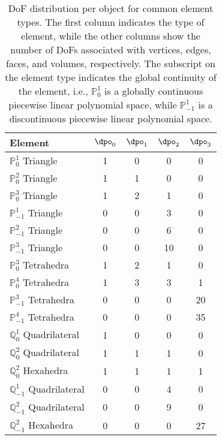 \begin{table}[!h]
\centering
\begin{tabular}{|l|c|c|c|c|}
\hline
\textbf{Element} & $\dpo_0$ & $\dpo_1$ & $\dpo_2$ & $\dpo_3$ \\
\hline
$\mathbb{P}^1_0$ Triangle & 1 & 0 & 0 & 0 \\
$\mathbb{P}^2_0$ Triangle & 1 & 1 & 0 & 0 \\
$\mathbb{P}^3_0$ Triangle & 1 & 2 & 1 & 0 \\
$\mathbb{P}^1_{-1}$ Triangle & 0 & 0 & 3 & 0 \\
$\mathbb{P}^2_{-1}$ Triangle & 0 & 0 & 6 & 0 \\
$\mathbb{P}^3_{-1}$ Triangle & 0 & 0 & 10 & 0 \\
$\mathbb{P}^3_0$ Tetrahedra & 1 & 2 & 1 & 0 \\
$\mathbb{P}^4_0$ Tetrahedra & 1 & 3 & 3 & 1 \\
$\mathbb{P}^3_{-1}$ Tetrahedra & 0 & 0 & 0 & 20 \\
$\mathbb{P}^4_{-1}$ Tetrahedra & 0 & 0 & 0 & 35 \\
\hline
$\mathbb{Q}^1_0$ Quadrilateral & 1 & 0 & 0 & 0 \\
$\mathbb{Q}^2_0$ Quadrilateral & 1 & 1 & 1 & 0 \\
$\mathbb{Q}^2_0$ Hexahedra & 1 & 1 & 1 & 1 \\
$\mathbb{Q}^1_{-1}$ Quadrilateral & 0 & 0 & 4 & 0 \\
$\mathbb{Q}^2_{-1}$ Quadrilateral & 0 & 0 & 9 & 0 \\
$\mathbb{Q}^2_{-1}$ Hexahedra & 0 & 0 & 0 & 27 \\
\hline
\end{tabular}
\caption{DoF distribution per object for common element types. The first column indicates the type of element, while the other columns show the number of DoFs associated with vertices, edges, faces, and volumes, respectively. The subscript on the element type indicates the global continuity of the element, i.e., $\mathbb{P}^1_0$ is a globally continuous piecewise linear polynomial space, while $\mathbb{P}^1_{-1}$ is a discontinuous piecewise linear polynomial space.}
\label{tab:dof_distribution}
\end{table}

